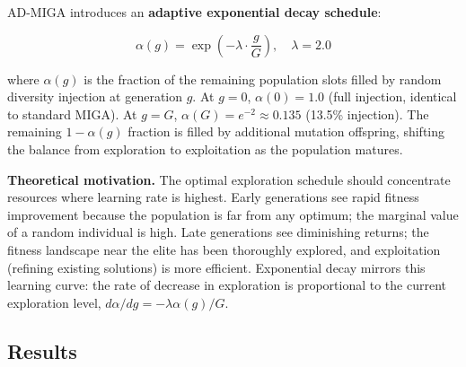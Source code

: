 AD-MIGA introduces an \textbf{adaptive exponential decay schedule}:

\begin{equation}
    \alpha(g) = \exp\!\left(-\lambda \cdot \frac{g}{G}\right), \quad \lambda = 2.0
    \label{eq:ad_decay}
\end{equation}

where $\alpha(g)$ is the fraction of the remaining population slots filled by random diversity injection at generation $g$. At $g=0$, $\alpha(0) = 1.0$ (full injection, identical to standard MIGA). At $g=G$, $\alpha(G) = e^{-2} \approx 0.135$ (13.5\% injection). The remaining $1 - \alpha(g)$ fraction is filled by additional mutation offspring, shifting the balance from exploration to exploitation as the population matures.

\textbf{Theoretical motivation.} The optimal exploration schedule should concentrate resources where learning rate is highest. Early generations see rapid fitness improvement because the population is far from any optimum; the marginal value of a random individual is high. Late generations see diminishing returns; the fitness landscape near the elite has been thoroughly explored, and exploitation (refining existing solutions) is more efficient. Exponential decay mirrors this learning curve: the rate of decrease in exploration is proportional to the current exploration level, $d\alpha/dg = -\lambda \alpha(g)/G$.

\subsection{Results}

